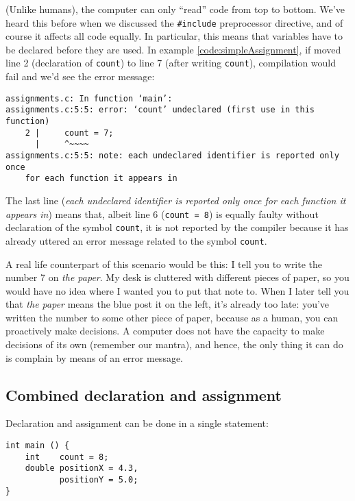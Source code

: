 \begin{hintbox}
(Unlike humans), the computer can only \enquote{read} code from top to bottom. We've heard this before when we discussed the \texttt{\#include} preprocessor directive, and of course it affects all code equally. In particular, this means that variables have to be declared before they are used. In example \ref{code:simpleAssignment}, if moved line 2 (declaration of \texttt{count}) to line 7 (after writing \texttt{count}), compilation would fail and we'd see the error message:

\begin{cmdbox}
\begin{verbatim}
assignments.c: In function ‘main’:
assignments.c:5:5: error: ‘count’ undeclared (first use in this function)
    2 |     count = 7;
      |     ^~~~~
assignments.c:5:5: note: each undeclared identifier is reported only once 
    for each function it appears in
\end{verbatim}
\end{cmdbox}

The last line (\emph{each undeclared identifier is reported only once for each function it appears in}) means that, albeit line 6 (\texttt{count = 8}) is equally faulty without declaration of the symbol \texttt{count}, it is not reported by the compiler because it has already uttered an error message related to the symbol \texttt{count}.

A real life counterpart of this scenario would be this: I tell you to write the number 7 on \emph{the paper}. My desk is cluttered with different pieces of paper, so you would have no idea where I wanted you to put that note to. When I later tell you that \emph{the paper} means the blue post it on the left, it's already too late: you've written the number to some other piece of paper, because as a human, you can proactively make decisions. A computer does not have the capacity to make decisions of its own (remember our mantra), and hence, the only thing it can do is complain by means of an error message.
\end{hintbox}

\newpage
\subsection{Combined declaration and assignment} \label{sec:valueAssignment}
Declaration and assignment can be done in a single statement:
\begin{codebox}[combinedAssignments.c]
\begin{verbatim}
int main () {
    int    count = 8;
    double positionX = 4.3,
           positionY = 5.0;
}
\end{verbatim}
 \label{code:combinedAssignment}
\end{codebox}

